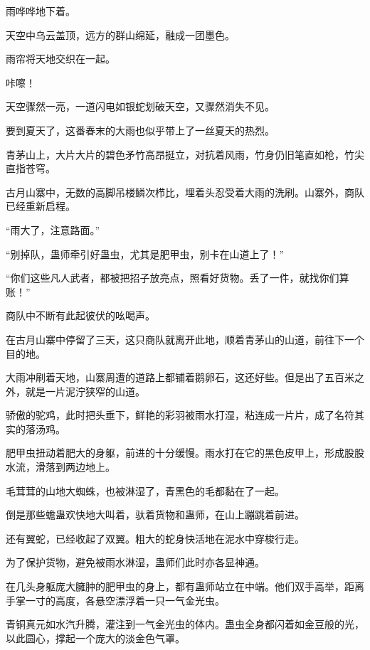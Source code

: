 
\begin{this_body}



雨哗哗地下着。

天空中乌云盖顶，远方的群山绵延，融成一团墨色。

雨帘将天地交织在一起。

咔嚓！

天空骤然一亮，一道闪电如银蛇划破天空，又骤然消失不见。

要到夏天了，这番春末的大雨也似乎带上了一丝夏天的热烈。

青茅山上，大片大片的碧色矛竹高昂挺立，对抗着风雨，竹身仍旧笔直如枪，竹尖直指苍穹。

古月山寨中，无数的高脚吊楼鳞次栉比，埋着头忍受着大雨的洗刷。山寨外，商队已经重新启程。

“雨大了，注意路面。”

“别掉队，蛊师牵引好蛊虫，尤其是肥甲虫，别卡在山道上了！”

“你们这些凡人武者，都被把招子放亮点，照看好货物。丢了一件，就找你们算账！”

商队中不断有此起彼伏的吆喝声。

在古月山寨中停留了三天，这只商队就离开此地，顺着青茅山的山道，前往下一个目的地。

大雨冲刷着天地，山寨周遭的道路上都铺着鹅卵石，这还好些。但是出了五百米之外，就是一片泥泞狭窄的山道。

骄傲的驼鸡，此时把头垂下，鲜艳的彩羽被雨水打湿，粘连成一片片，成了名符其实的落汤鸡。

肥甲虫扭动着肥大的身躯，前进的十分缓慢。雨水打在它的黑色皮甲上，形成股股水流，滑落到两边地上。

毛茸茸的山地大蜘蛛，也被淋湿了，青黑色的毛都黏在了一起。

倒是那些蟾蛊欢快地大叫着，驮着货物和蛊师，在山上蹦跳着前进。

还有翼蛇，已经收起了双翼。粗大的蛇身快活地在泥水中穿梭行走。

为了保护货物，避免被雨水淋湿，蛊师们此时亦各显神通。

在几头身躯庞大臃肿的肥甲虫的身上，都有蛊师站立在中端。他们双手高举，距离手掌一寸的高度，各悬空漂浮着一只一气金光虫。

青铜真元如水汽升腾，灌注到一气金光虫的体内。蛊虫全身都闪着如金豆般的光，以此圆心，撑起一个庞大的淡金色气罩。


\end{this_body}
